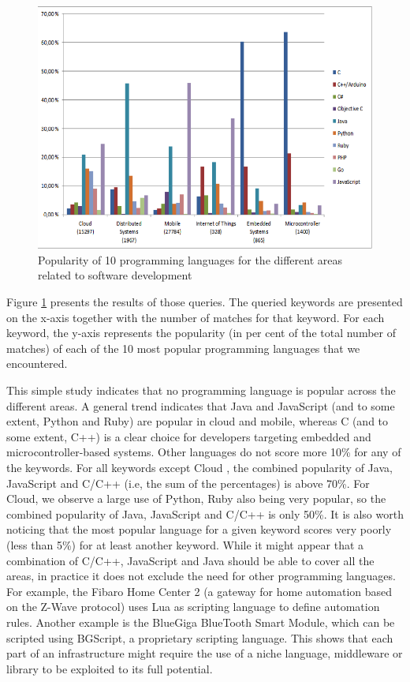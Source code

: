 \begin{figure}[h]
	\center
	\includegraphics[scale=1.]{Background/fig/github}
	\caption{Popularity of 10 programming languages for the different areas related to software development}
	\label{fig:github}
\end{figure}

Figure \ref{fig:github} presents the results of those queries. The queried keywords are presented on the x-axis together with the number of matches for that keyword. For each keyword, the y-axis represents the popularity (in per cent of the total number of matches) of each of the 10 most popular programming languages that we encountered.


This simple study indicates that no programming language is popular across the different areas. A general trend indicates that Java and JavaScript (and to some extent, Python and Ruby) are popular in cloud and mobile, whereas C (and to some extent, C++) is a clear choice for developers targeting embedded and microcontroller-based systems. Other languages do not score more 10\% for any of the keywords. 
For all keywords except Cloud , the combined popularity of Java, JavaScript and C/C++ (i.e, the sum
of the percentages) is above 70\%. For Cloud, we observe a large use of Python, Ruby also being very popular, so the combined popularity of Java, JavaScript and C/C++ is only 50\%. It is also worth noticing that the most popular language for a given keyword scores very poorly (less than 5\%) for at least another keyword. While it might appear that a combination of C/C++, JavaScript and Java should be able to cover all the areas, in practice it does not exclude the need for other programming languages. For example, the Fibaro Home Center 2 (a gateway for home automation based on the Z-Wave protocol) uses Lua as scripting language to define automation rules. Another example is the BlueGiga BlueTooth Smart Module, which can be scripted using BGScript, a proprietary scripting language. This shows that each part of an infrastructure might require the use of a niche language, middleware or library to be exploited to its full potential.


